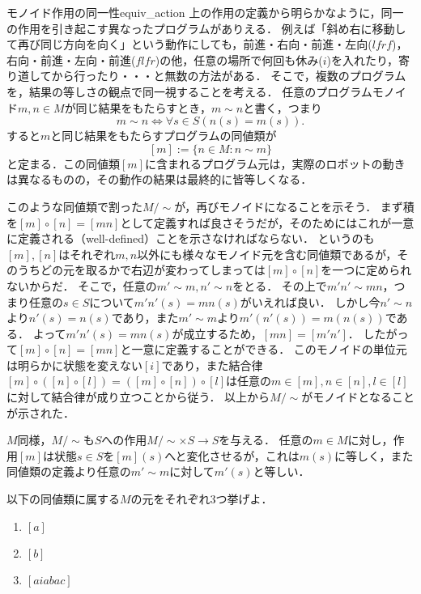 \documentclass[11pt,a4paper, dvipdfmx]{jsarticle}
\begin{document}
\begin{hatten}{モノイド作用の同一性}{equiv_action}
    上の作用の定義から明らかなように，同一の作用を引き起こす異なったプログラムがありえる．
    例えば「斜め右に移動して再び同じ方向を向く」という動作にしても，前進・右向・前進・左向($lfrf$)，右向・前進・左向・前進($flfr$)の他，任意の場所で何回も休み($i$)を入れたり，寄り道してから行ったり・・・と無数の方法がある．
    そこで，複数のプログラムを，結果の等しさの観点で同一視することを考える．
    任意のプログラムモノイド$m,n \in M$が同じ結果をもたらすとき，$m \sim n$と書く，つまり
    \[ m \sim n  \iff \forall s \in S (n(s) = m(s)). \]
    すると$m$と同じ結果をもたらすプログラムの同値類が
    \[ [m] := \{n \in M: n \sim m \} \]
    と定まる．この同値類$[m]$に含まれるプログラム元は，実際のロボットの動きは異なるものの，その動作の結果は最終的に皆等しくなる．

    このような同値類で割った$M/\sim$が，再びモノイドになることを示そう．
    まず積を$[m]\circ[n] = [mn]$として定義すれば良さそうだが，そのためにはこれが一意に定義される（well-defined）ことを示さなければならない．
    というのも$[m], [n]$はそれぞれ$m,n$以外にも様々なモノイド元を含む同値類であるが，そのうちどの元を取るかで右辺が変わってしまっては$[m]\circ[n]$を一つに定められないからだ．
    そこで，任意の$m' \sim m, n' \sim n$をとる．
    その上で$m'n' \sim mn$，つまり任意の$s \in S$について$m'n'(s) = mn(s)$がいえれば良い．
    しかし今$n' \sim n$より$n'(s) = n(s)$であり，また$m' \sim m$より$m'(n'(s)) = m(n(s))$である．
    よって$m'n'(s) = mn(s)$が成立するため，$[mn] = [m'n']$．
    したがって$[m]\circ[n] = [mn]$と一意に定義することができる．
    このモノイドの単位元は明らかに状態を変えない$[i]$であり，また結合律$[m]\circ([n]\circ[l]) = ([m]\circ[n])\circ[l]$は任意の$m \in [m], n \in [n], l \in [l]$に対して結合律が成り立つことから従う．
    以上から$M/\sim$がモノイドとなることが示された．
    
    $M$同様，$M/\sim$も$S$への作用$M/\sim \times S \to S$を与える．
    任意の$m \in M$に対し，作用$[m]$は状態$s \in S$を$[m](s)$へと変化させるが，これは$m(s)$に等しく，また同値類の定義より任意の$m' \sim m$に対して$m'(s)$と等しい．
\end{hatten}

\begin{renshu}{}{}
    以下の同値類に属する$M$の元をそれぞれ3つ挙げよ．
    \begin{enumerate}
        \item $[a]$
        \item $[b]$
        \item $[aiabac]$
    \end{enumerate}
\end{renshu}
\end{document}
